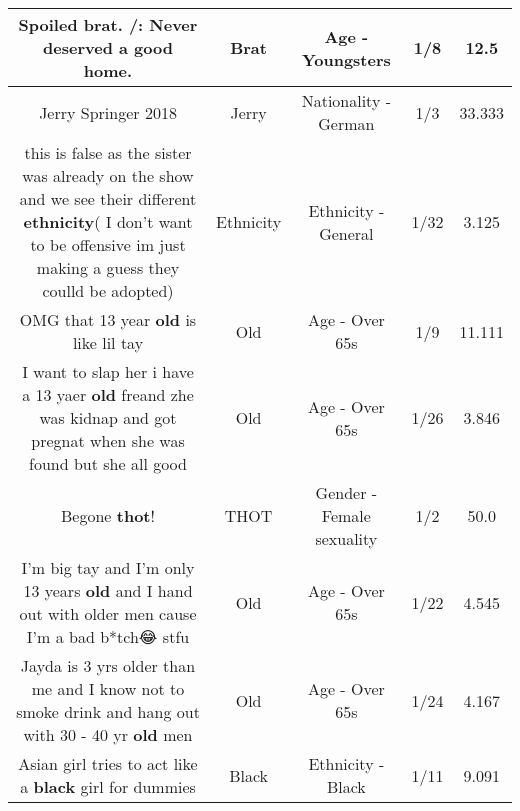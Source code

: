 \documentclass[11pt]{article}
\newlength\mylength
\begin{document}
\begin{center}
\begin{longtable}{|C{.65\mylength}|C{.30\mylength}|C{.12\mylength}|C{.12\mylength}|C{.12\mylength}|}
  \small Spoiled \textbf{brat}. /: Never deserved a good home.\normalsize   & Brat & Age - Youngsters & 1/8 & 12.5 \\  \hline
  \small Jerry Springer 2018\normalsize   & Jerry & Nationality - German & 1/3 & 33.333 \\  \hline
  \small this is false as the sister was already on the show and we see their different \textbf{ethnicity}( I don't want to be offensive im just making a guess they coulld be adopted)\normalsize   & Ethnicity & Ethnicity - General & 1/32 & 3.125 \\  \hline
  \small OMG that 13 year \textbf{old} is like lil tay\normalsize   & Old & Age - Over 65s & 1/9 & 11.111 \\  \hline
  \small I want to slap her i have a 13 yaer \textbf{old} freand zhe was kidnap and got pregnat when she was found but she all good\normalsize   & Old & Age - Over 65s & 1/26 & 3.846 \\  \hline
  \small Begone \textbf{thot}!\normalsize   & THOT & Gender - Female sexuality & 1/2 & 50.0 \\  \hline
  \small I'm big tay and I'm only 13 years \textbf{old} and I hand out with older men cause I'm a bad b*tch😂 stfu\normalsize   & Old & Age - Over 65s & 1/22 & 4.545 \\  \hline
  \small Jayda is 3 yrs older than me and I know not to smoke drink and hang out with 30 - 40 yr \textbf{old} men\normalsize   & Old & Age - Over 65s & 1/24 & 4.167 \\  \hline
  \small Asian girl tries to act like a \textbf{black} girl for dummies\normalsize   & Black & Ethnicity - Black & 1/11 & 9.091 \\  \hline

\end{longtable}
\end{center}
\end{document}

